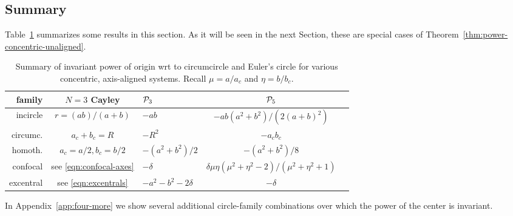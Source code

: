 \subsection*{Summary}

Table~\ref{tab:concentric-summary} summarizes some results in this section. As it will be seen in the next Section, these are special cases of Theorem~\ref{thm:power-concentric-unaligned}.

\begin{table}
\centering
\begin{tabular}{|r|c|l|c|c|}
\hline
family & $N=3$ Cayley & $\P_3$ & $\P_5$ \\
\hline
incircle & $r=(ab)/(a+b)$ & $-ab$ &  $-a b (a^2 + b^2)/(2(a + b)^2)$  \\
circumc. & $a_c+b_c=R$ & $-R^2$ & $-a_c b_c$ \\
homoth. & $a_c=a/2,b_c=b/2$  & $-({a^2+b^2})/{2}$ & $-({a^2+b^2})/{8}$  \\
confocal & see \eqref{eqn:confocal-axes} & $-\delta$ & ${\delta \mu \eta (\mu^2+\eta^2-2)}/{(\mu^2+\eta^2+1)}$\\
excentral & see \eqref{eqn:excentrals} & $-a^2-b^2-2\delta$ & $-\delta$ \\
\hline
\end{tabular}
\caption{Summary of invariant power of origin wrt to circumcircle and Euler's circle for various concentric, axis-aligned systems. Recall $\mu=a/a_c$ and $\eta=b/b_c$.}
\label{tab:concentric-summary}
\end{table}


In Appendix~\ref{app:four-more} we show several additional circle-family combinations over which the power of the center is invariant.
